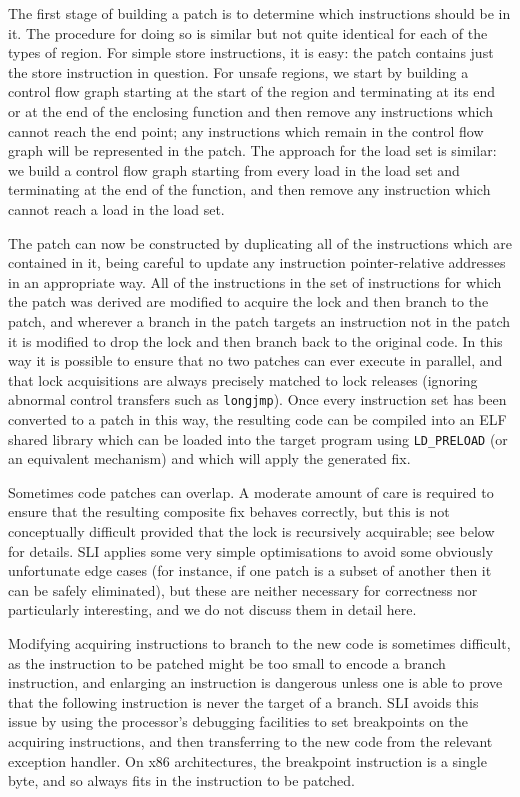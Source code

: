 \documentclass[10pt,twocolumn,preprint,natbib,authoryear]{sigplanconf}
\newcommand{\editorial}[1]{}
\begin{document}
The first stage of building a patch is to determine which instructions
should be in it.  The procedure for doing so is similar but not quite
identical for each of the types of region.  For simple store
instructions, it is easy: the patch contains just the store
instruction in question.  For unsafe regions, we start by building a
control flow graph starting at the start of the region and terminating
at its end or at the end of the enclosing function and then remove any
instructions which cannot reach the end point; any instructions which
remain in the control flow graph will be represented in the patch.
The approach for the load set is similar: we build a control flow
graph starting from every load in the load set and terminating at the
end of the function, and then remove any instruction which cannot
reach a load in the load set.

The patch can now be constructed by duplicating all of the
instructions which are contained in it, being careful to update any
instruction pointer-relative addresses in an appropriate way.  All of
the instructions in the set of instructions for which the patch was
derived are modified to acquire the lock and then branch to the patch,
and wherever a branch in the patch targets an instruction not in the
patch it is modified to drop the lock and then branch back to the
original code.  In this way it is possible to ensure that no two
patches can ever execute in parallel, and that lock acquisitions are
always precisely matched to lock releases (ignoring abnormal control
transfers such as \verb|longjmp|)\editorial{Very non-obvious why this
  is true.}.  Once every instruction set has been converted to a patch
in this way, the resulting code can be compiled into an ELF shared
library which can be loaded into the target program using
\verb|LD_PRELOAD| (or an equivalent mechanism) and which will apply
the generated fix.

Sometimes code patches can overlap.  A moderate amount of care is
required to ensure that the resulting composite fix behaves correctly,
but this is not conceptually difficult provided that the lock is
recursively acquirable; see below for details.  SLI applies some very
simple optimisations to avoid some obviously unfortunate edge cases
(for instance, if one patch is a subset of another then it can be
safely eliminated), but these are neither necessary for correctness
nor particularly interesting, and we do not discuss them in detail
here.

Modifying acquiring instructions to branch to the new code is
sometimes difficult, as the instruction to be patched might be too
small to encode a branch instruction, and enlarging an instruction is
dangerous unless one is able to prove that the following instruction
is never the target of a branch.  SLI avoids this issue by using the
processor's debugging facilities to set breakpoints on the acquiring
instructions, and then transferring to the new code from the relevant
exception handler.  On x86 architectures, the breakpoint instruction
is a single byte, and so always fits in the instruction to be patched.
\end{document}
